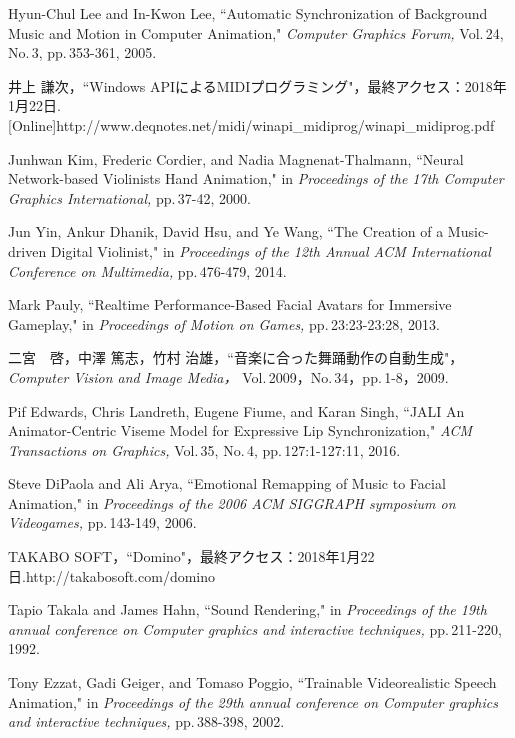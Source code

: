 \begin{thebibliography}{55}
Hyun-Chul Lee and In-Kwon Lee,
 ``Automatic Synchronization of Background Music and Motion in Computer Animation,"
 \textit{Computer Graphics Forum,} Vol.\,24, No.\,3, pp.\,353-361, 2005.

井上 謙次，``Windows APIによるMIDIプログラミング"，最終アクセス：2018年1月22日.\,
[Online]http://www.deqnotes.net/midi/winapi\_midiprog/winapi\_midiprog.pdf

Junhwan Kim, Frederic Cordier, and Nadia Magnenat-Thalmann,
 ``Neural Network-based Violinists Hand Animation,"
 in \textit{Proceedings of the 17th Computer Graphics International,} pp.\,37-42, 2000.

Jun Yin, Ankur Dhanik, David Hsu, and Ye Wang,
 ``The Creation of a Music-driven Digital Violinist,"
 in \textit{Proceedings of the 12th Annual ACM International Conference on Multimedia,} pp.\,476-479, 2014.
 
Mark Pauly,
 ``Realtime Performance-Based Facial Avatars for Immersive Gameplay," in \textit{Proceedings of Motion on Games,} pp.\,23:23-23:28, 2013.

二宮　啓，中澤 篤志，竹村 治雄，``音楽に合った舞踊動作の自動生成"，
\textit{Computer Vision and Image Media，} Vol.\,2009，No.\,34，pp.\,1-8，2009.
 
Pif Edwards, Chris Landreth, Eugene Fiume, and Karan Singh,
 ``JALI An Animator-Centric Viseme Model for Expressive Lip Synchronization,"
 \textit{ACM Transactions on Graphics,} Vol.\,35, No.\,4, pp.\,127:1-127:11, 2016.

Steve DiPaola and Ali Arya,
 ``Emotional Remapping of Music to Facial Animation,"
 in \textit{Proceedings of the 2006 ACM SIGGRAPH symposium on Videogames,} pp.\,143-149, 2006.
  
TAKABO SOFT，``Domino"，最終アクセス：2018年1月22日.\newline
[Online]http://takabosoft.com/domino

Tapio Takala and James Hahn,
 ``Sound Rendering,"
 in \textit{Proceedings of the 19th annual conference on Computer graphics and interactive techniques,} pp.\,211-220, 1992.

Tony Ezzat, Gadi Geiger, and Tomaso Poggio,
 ``Trainable Videorealistic Speech Animation,"
 in \textit{Proceedings of the 29th annual conference on Computer graphics and interactive techniques,} pp.\,388-398, 2002.


\end{thebibliography}
